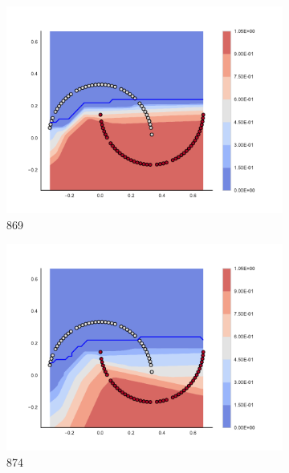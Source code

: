 \begin{figure}[h]
\begin{subfigure}[b]{0.09\textwidth}
    \includegraphics[clip, trim=2.35cm 1.75cm 4.5cm 0cm,width=\textwidth]{img/convergence/869.pdf}
    \caption{869}
    \label{fig:convergence_869}
\end{subfigure}
%
\begin{subfigure}[b]{0.09\textwidth}
    \includegraphics[clip, trim=2.35cm 1.75cm 4.5cm 0cm,width=\textwidth]{img/convergence/874.pdf}
    \caption{874}
    \label{fig:convergence_874}
\end{subfigure}
%
\begin{subfigure}[b]{0.09\textwidth}

\end{subfigure}
\end{figure}
